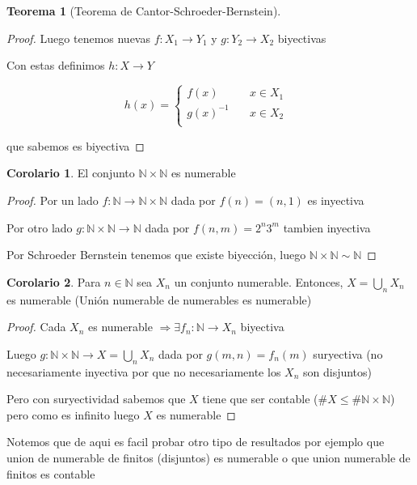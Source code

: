 \documentclass[12pt]{article}
\newcommand{\N}{\mathbb{N}}
\newcommand{\Ra}{\Rightarrow}
\newcommand{\ra}{\rightarrow}
\theoremstyle{definition}
\newtheorem{theorem}{Teorema}
\newtheorem{corollary}{Corolario}[theorem]
\begin{document}
\begin{theorem}[Teorema de Cantor-Schroeder-Bernstein]
\begin{proof}
    Luego tenemos nuevas $f: X_{1} \ra Y_{1}$ y $g: Y_{2} \ra X_{2}$ biyectivas

    Con estas definimos $h : X \ra Y$ 

\[
h(x) =
     \begin{cases}
       \text{$f(x)$} &\quad\text{$x \in X_{1}$ }\\
       \text{$g(x)^{-1}$} &\quad\text{$x \in X_{2}$} \\
     \end{cases}
\]

que sabemos es biyectiva
  \end{proof}


\end{theorem}

\begin{corollary}
  El conjunto $\N \times \N$ es numerable

  \begin{proof}
    Por un lado $f: \N \ra \N \times \N$ dada por $f(n) = (n,1)$ es inyectiva

    Por otro lado $g: \N \times \N \ra \N $ dada por $f(n,m) = 2^n3^m $ tambien inyectiva

    Por Schroeder Bernstein tenemos que existe biyección, luego $\N \times \N \sim \N$
  \end{proof}
\end{corollary}

\begin{corollary}
  Para $n \in \N $ sea $X_{n}$ un conjunto numerable. Entonces, $X = \bigcup_{n} X_{n}$ es numerable (Unión numerable de numerables es numerable)

  \begin{proof}
    Cada $X_{n}$ es numerable $ \Ra \exists f_{n}: \N \ra X_{n}$ biyectiva

    Luego $g: \N \times \N \ra X = \bigcup_{n} X_{n}$ dada por $g(m,n) = f_{n}(m)$ suryectiva (no necesariamente inyectiva por que no necesariamente los $X_{n}$ son disjuntos)

    Pero con suryectividad sabemos que $X$ tiene que ser contable ($\# X \leq \# \N \times \N$) pero como es infinito luego $X$ es numerable 
  \end{proof}
  Notemos que de aqui es facil probar otro tipo de resultados por ejemplo que union de numerable de finitos (disjuntos) es numerable o que union numerable de finitos es contable 
\end{corollary}
\end{document}
